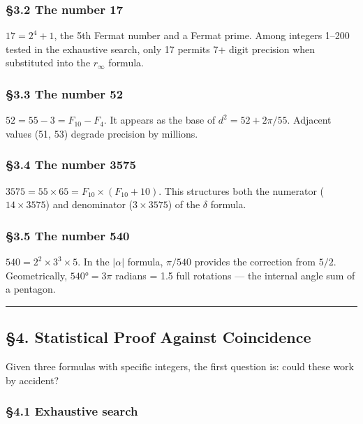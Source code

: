 \documentclass[
  11pt,
  a4paper]{article}
\begin{document}
\subsubsection{§3.2 The number 17}\label{the-number-17}

\(17 = 2^4 + 1\), the 5th Fermat number and a Fermat prime. Among
integers 1--200 tested in the exhaustive search, only 17 permits 7+
digit precision when substituted into the \(r_\infty\) formula.

\subsubsection{§3.3 The number 52}\label{the-number-52}

\(52 = 55 - 3 = F_{10} - F_4\). It appears as the base of
\(d^2 = 52 + 2\pi/55\). Adjacent values (51, 53) degrade precision by
millions.

\subsubsection{§3.4 The number 3575}\label{the-number-3575}

\(3575 = 55 \times 65 = F_{10} \times (F_{10} + 10)\). This structures
both the numerator (\(14 \times 3575\)) and denominator
(\(3 \times 3575\)) of the \(\delta\) formula.

\subsubsection{§3.5 The number 540}\label{the-number-540}

\(540 = 2^2 \times 3^3 \times 5\). In the \(|\alpha|\) formula,
\(\pi/540\) provides the correction from \(5/2\). Geometrically,
\(540° = 3\pi\) radians = 1.5 full rotations --- the internal angle sum
of a pentagon.

\begin{center}\rule{0.5\linewidth}{0.5pt}\end{center}

\subsection{§4. Statistical Proof Against
Coincidence}\label{statistical-proof-against-coincidence}

Given three formulas with specific integers, the first question is:
could these work by accident?

\subsubsection{§4.1 Exhaustive search}\label{exhaustive-search}
\end{document}
